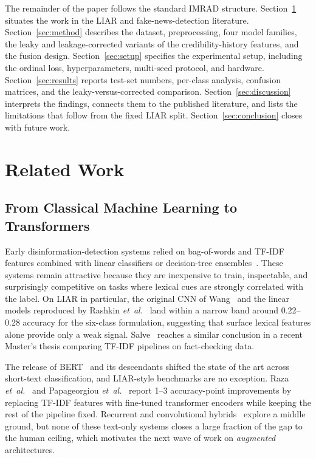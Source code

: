 \documentclass[journal]{IEEEtran}
\begin{document}
The remainder of the paper follows the standard IMRAD structure. Section~\ref{sec:related} situates the work in the LIAR and fake-news-detection literature. Section~\ref{sec:method} describes the dataset, preprocessing, four model families, the leaky and leakage-corrected variants of the credibility-history features, and the fusion design. Section~\ref{sec:setup} specifies the experimental setup, including the ordinal loss, hyperparameters, multi-seed protocol, and hardware. Section~\ref{sec:results} reports test-set numbers, per-class analysis, confusion matrices, and the leaky-versus-corrected comparison. Section~\ref{sec:discussion} interprets the findings, connects them to the published literature, and lists the limitations that follow from the fixed LIAR split. Section~\ref{sec:conclusion} closes with future work.

\section{Related Work}
\label{sec:related}

\subsection{From Classical Machine Learning to Transformers}
Early disinformation-detection systems relied on bag-of-words and TF-IDF features combined with linear classifiers or decision-tree ensembles~\cite{khanam2021,irawan2025,sanahmed2023}. These systems remain attractive because they are inexpensive to train, inspectable, and surprisingly competitive on tasks where lexical cues are strongly correlated with the label. On LIAR in particular, the original CNN of Wang~\cite{wang2017liar} and the linear models reproduced by Rashkin \emph{et~al.}~\cite{shu2017} land within a narrow band around 0.22--0.28 accuracy for the six-class formulation, suggesting that surface lexical features alone provide only a weak signal. Salve~\cite{salve2025} reaches a similar conclusion in a recent Master's thesis comparing TF-IDF pipelines on fact-checking data.

The release of BERT~\cite{devlin2019bert} and its descendants shifted the state of the art across short-text classification, and LIAR-style benchmarks are no exception. Raza \emph{et~al.}~\cite{raza2025} and Papageorgiou \emph{et~al.}~\cite{papageorgiou2025} report 1--3 accuracy-point improvements by replacing TF-IDF features with fine-tuned transformer encoders while keeping the rest of the pipeline fixed. Recurrent and convolutional hybrids~\cite{mahara2022,gundapu2021} explore a middle ground, but none of these text-only systems closes a large fraction of the gap to the human ceiling, which motivates the next wave of work on \emph{augmented} architectures.
\end{document}
